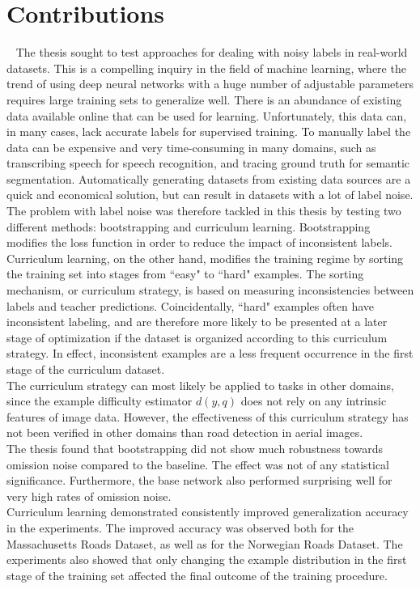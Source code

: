 \section{Contributions}~\label{cont}
\label{sec:Contributions}
The thesis sought to test approaches for dealing with noisy labels in real-world datasets. This is a compelling inquiry in the field of machine learning, where the trend of using deep neural networks with a huge number of adjustable parameters requires large training sets to generalize well. There is an abundance of existing data available online that can be used for learning. Unfortunately, this data can, in many cases, lack accurate labels for supervised training. To manually label the data can be expensive and very time-consuming in many domains, such as transcribing speech for speech recognition, and tracing ground truth for semantic segmentation. Automatically generating datasets from existing data sources are a quick and economical solution, but can result in datasets with a lot of label noise.\\

The problem with label noise was therefore tackled in this thesis by testing two different methods: bootstrapping and curriculum learning. Bootstrapping modifies the loss function in order to reduce the impact of inconsistent labels. Curriculum learning, on the other hand,  modifies the training regime by sorting the training set into stages from ``easy" to ``hard" examples. The sorting mechanism, or curriculum strategy, is based on measuring inconsistencies between labels and teacher predictions. Coincidentally, ``hard" examples often have inconsistent labeling, and are therefore more likely to be presented at a later stage of optimization if the dataset is organized according to this curriculum strategy. In effect, inconsistent examples are a less frequent occurrence in the first stage of the curriculum dataset.\\
 
The curriculum strategy can most likely be applied to tasks in other domains, since the example difficulty estimator $d(y,q)$ does not rely on any intrinsic features of image data. However, the effectiveness of this curriculum strategy has not been verified in other domains than road detection in aerial images.\\

The thesis found that bootstrapping did not show much robustness towards omission noise compared to the baseline. The effect was not of any statistical significance. Furthermore, the base network also performed surprising well for very high rates of omission noise. \\

Curriculum learning demonstrated consistently improved generalization accuracy in the experiments. The improved accuracy was observed both for the Massachusetts Roads Dataset, as well as for the Norwegian Roads Dataset. The experiments also showed that only changing the example distribution in the first stage of the training set affected the final outcome of the training procedure.\\

